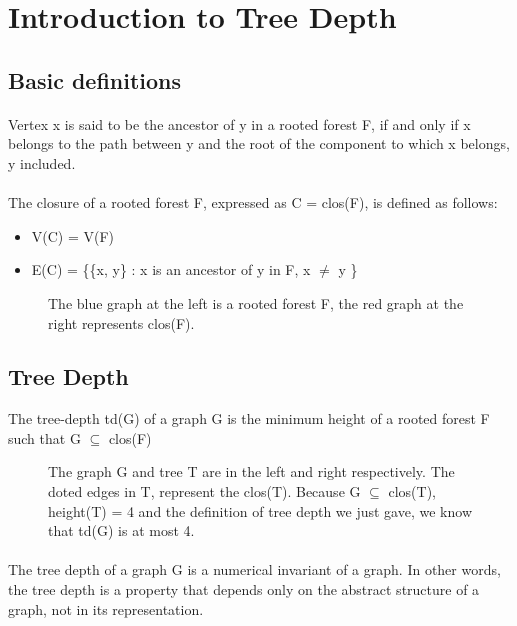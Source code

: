 \section{Introduction to Tree Depth}

\subsection{Basic definitions}

\paragraph{}
Vertex x is said to be the ancestor of y in a rooted forest F, if and only if x belongs to the path between y and the root of the component to which x belongs, y included.
\paragraph{}
The closure of a rooted forest F, expressed as C = clos(F), is defined as follows:
\begin{itemize}
  \item V(C) = V(F)
  \item E(C) = \{\{x, y\} : x is an ancestor of y in F, x $\neq$ y \}
\end{itemize}
\begin{figure}[h]

\caption{The blue graph at the left is a rooted forest F, the red graph at the right represents clos(F).}
\end{figure}

\subsection{Tree Depth}

\begin{definition}
The tree-depth td(G) of a graph G is the minimum height of a rooted forest F such that G $\subseteq$ clos(F)
\end{definition}

\begin{figure}[H]

\caption{The graph G and tree T are in the left and right respectively. The doted edges in T, represent the clos(T). Because G $\subseteq$ clos(T), height(T) = 4 and the definition of tree depth we just gave, we know that td(G) is at most 4.\label{fig:3d-cube}}
\end{figure}
\paragraph{}
The tree depth of a graph G is a numerical invariant of a graph. In other words, the tree depth is a property that depends only  on the abstract structure of a graph, not in its representation.	

